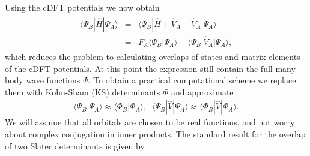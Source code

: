 \documentclass[letterpaper,10pt,english]{sphinxmanual}
\begin{document}
Using the cDFT potentials we now obtain
\begin{equation*}
\begin{split}\begin{aligned}
\langle\Psi_{B}|\hat{H}|\Psi_{A}\rangle & = & \langle\Psi_{B}|\hat{H}+\hat{V}_{A}-\hat{V}_{A}|\Psi_{A}\rangle\nonumber \\
 & = & F_{A}\langle\Psi_{B}|\Psi_{A}\rangle-\langle\Psi_{B}|\hat{V}_{A}|\Psi_{A}\rangle,\end{aligned}\end{split}
\end{equation*}
which reduces the problem to calculating overlaps of states and matrix
elements of the cDFT potentials. At this point the expression still
contain the full many-body wave functions \(\Psi\). To obtain a
practical computational scheme we replace them with Kohn-Sham (KS)
determinants \(\Phi\) and approximate
\begin{equation*}
\begin{split}\langle\Psi_{B}|\Psi_{A}\rangle\approx\langle\Phi_{B}|\Phi_{A}\rangle,\;\;\langle\Psi_{B}|\hat{V}|\Psi_{A}\rangle\approx\langle\Phi_{B}|\hat{V}|\Phi_{A}\rangle.\end{split}
\end{equation*}
We will assume that all orbitals are chosen to be real functions, and
not worry about complex conjugation in inner products. The standard
result for the overlap of two Slater determinants is given by
\end{document}
